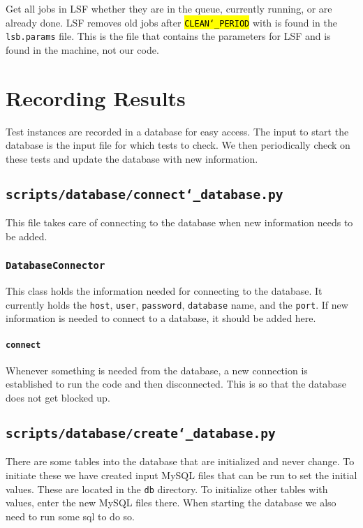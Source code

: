 \documentclass{article}
\newcommand{\un}[0]{\char`_}
\newcommand{\code}[1]{\textcolor{red}{\hl{\texttt{#1}}}}
\begin{document}
Get all jobs in LSF whether they are in the queue, currently running, or are already done. LSF removes old jobs after \code{CLEAN\un PERIOD} with is found in the \texttt{lsb.params} file. This is the file that contains the parameters for LSF and is found in the machine, not our code.

\section{Recording Results}

Test instances are recorded in a database for easy access. The input to start the database is the input file for which tests to check. We then periodically check on these tests and update the database with new information. 

\subsection{\texttt{scripts/database/connect\un database.py}}

This file takes care of connecting to the database when new information needs to be added.

\subsubsection{\texttt{DatabaseConnector}}

This class holds the information needed for connecting to the database. It currently holds the \texttt{host}, \texttt{user}, \texttt{password}, \texttt{database} name, and the \texttt{port}. If new information is needed to connect to a database, it should be added here.

\paragraph{\texttt{connect}}

Whenever something is needed from the database, a new connection is established to run the code and then disconnected. This is so that the database does not get blocked up.

\subsection{\texttt{scripts/database/create\un database.py}}

There are some tables into the database that are initialized and never change. To initiate these we have created input MySQL files that can be run to set the initial values. These are located in the \texttt{db} directory. To initialize other tables with values, enter the new MySQL files there. When starting the database we also need to run some sql to do so.
\end{document}
